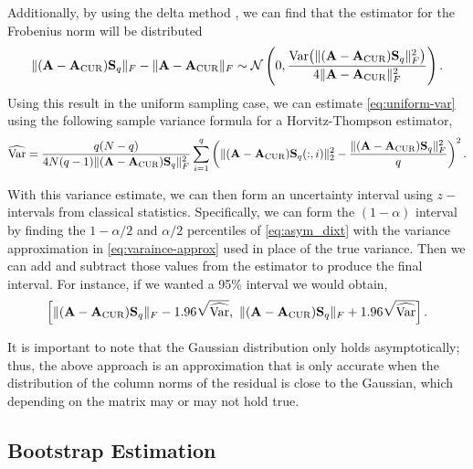 \documentclass[11pt]{article}
\newcommand{\curX}{\mathbf{A}_{\textup{CUR}}}
\begin{document}
Additionally, by using the delta method \cite{oehlert1992note}, we can find that the estimator for the Frobenius norm will be distributed
\begin{equation}\label{eq:asym_dixt}
    \|(\mathbf{A} - \curX)\mathbf{S}_q\|_F - \|\mathbf{A} - \curX\|_F  \sim \mathcal{N}\left(0, \frac{\operatorname{Var}\!\left(\|(\mathbf{A}-\curX)\mathbf{S}_q\|_F^2\right)}{4\|\mathbf{A} - \curX\|_F^2}\right).
\end{equation}
Using this result in the uniform sampling case, we can estimate \cref{eq:uniform-var} using the following sample variance formula for a Horvitz-Thompson estimator,
\begin{equation}\label{eq:varaince-approx}
    \widehat{\text{Var}} = \frac{q(N-q)}{4N(q-1)\|(\mathbf{A} - \curX)\mathbf{S}_q\|_F^2} \sum_{i=1}^q \left(\|(\mathbf{A} - \curX)\mathbf{S}_q(:,i)\|_2^2 - \frac{\|(\mathbf{A} - \curX)\mathbf{S}_q\|_F^2}{q} \right)^2.
\end{equation}

With this variance estimate, we can then form an uncertainty interval using $z-$intervals from classical statistics. Specifically, we can form the $(1 - \alpha)$ interval by finding the $1 - \alpha/2$ and $\alpha/2$ percentiles of \cref{eq:asym_dixt} with the variance approximation in \cref{eq:varaince-approx} used in place of the true variance. Then we can add and subtract those values from the estimator to produce the final interval. For instance, if we wanted a 95\% interval we would obtain,
\begin{equation}
    \left[\|(\mathbf{A} - \curX)\mathbf{S}_q\|_F-1.96\sqrt{\widehat{\text{Var}}},\text{ } \|(\mathbf{A} - \curX)\mathbf{S}_q\|_F +1.96\sqrt{\widehat{\text{Var}}}\right].
\end{equation}

It is important to note that the Gaussian distribution only holds asymptotically; thus, the above approach is an approximation that is only accurate when the distribution of the column norms of the residual is close to the Gaussian, which depending on the matrix may or may not hold true.

\subsection{Bootstrap Estimation}\label{sec:boot}
\end{document}
